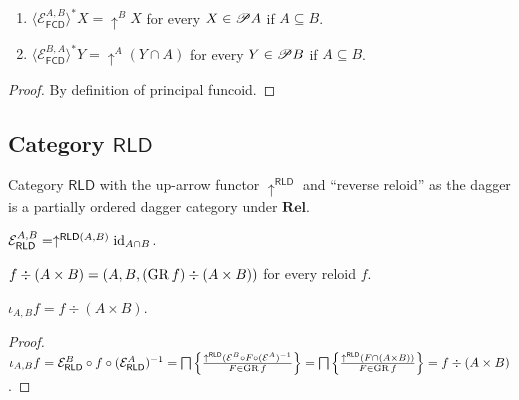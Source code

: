 \begin{prop}
  ~
  \begin{enumerate}
    \item $\langle \mathcal{E}_{\mathsf{FCD}}^{A,B} \rangle^{\ast} X
    = \uparrow^B X$ for every $X \in \mathscr{P} A$ if $A \subseteq B$.
    
    \item $\langle \mathcal{E}_{\mathsf{FCD}}^{B,A} \rangle^{\ast}
    Y = \uparrow^A (Y \cap A)$ for every $Y \in \mathscr{P} B$ if $A \subseteq
    B$.
  \end{enumerate}
\end{prop}

\begin{proof}
  By definition of principal funcoid.
\end{proof}


\subsection{\texorpdfstring{Category $\mathsf{RLD}$}{Category RLD}}

Category $\mathsf{RLD}$ with the up-arrow functor
$\uparrow^{\mathsf{RLD}}$ and ``reverse reloid'' as the dagger is a
partially ordered dagger category under $\mathbf{Rel}$.

\begin{obvious}
$\mathcal{E}_{\mathsf{RLD}}^{A,B} = \uparrow^{\mathsf{RLD} (A ,
B)} \operatorname{id}_{A \cap B}$.
\end{obvious}

\begin{defn}
  $f \div (A \times B) = (A , B , (\operatorname{GR} f) \div (A \times B))$ for every
  reloid $f$.
\end{defn}

\begin{prop}
  $\iota_{A, B} f = f \div (A \times B)$.
\end{prop}

\begin{proof}
  $\iota_{A, B} f = \mathcal{E}_{\mathsf{RLD}}^{B}
\circ f \circ (\mathcal{E}_{\mathsf{RLD}}^{A})^{-1} =
\bigsqcap \left\{ \frac{ \uparrow^{\mathsf{RLD}} (\mathcal{E}^{B} \circ F \circ (\mathcal{E}^{A})^{-1}
}{ F \in \operatorname{GR} f }\right\} = \bigsqcap \left\{ \frac{
\uparrow^{\mathsf{RLD}} (F \cap (A \times B))}{F \in \operatorname{GR} f }\right\} = f \div (A \times B)$.

\end{proof}

